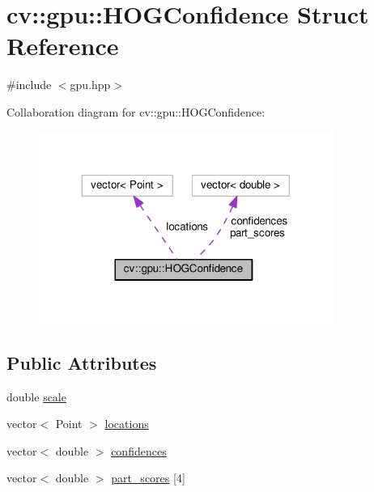 \hypertarget{structcv_1_1gpu_1_1HOGConfidence}{\section{cv\-:\-:gpu\-:\-:H\-O\-G\-Confidence Struct Reference}
\label{structcv_1_1gpu_1_1HOGConfidence}
}


{\ttfamily \#include $<$gpu.\-hpp$>$}



Collaboration diagram for cv\-:\-:gpu\-:\-:H\-O\-G\-Confidence\-:\nopagebreak
\begin{figure}[H]
\begin{center}
\leavevmode
\includegraphics[width=272pt]{structcv_1_1gpu_1_1HOGConfidence__coll__graph}
\end{center}
\end{figure}
\subsection*{Public Attributes}
\begin{DoxyCompactItemize}
\item 
double \hyperlink{structcv_1_1gpu_1_1HOGConfidence_af738aabee1627811b755e2684c469f0d}{scale}
\item 
vector$<$ Point $>$ \hyperlink{structcv_1_1gpu_1_1HOGConfidence_abc89125e427cdf2acd7d15643abbf302}{locations}
\item 
vector$<$ double $>$ \hyperlink{structcv_1_1gpu_1_1HOGConfidence_a826ac3c9eb800b4dd0efe393e29262d6}{confidences}
\item 
vector$<$ double $>$ \hyperlink{structcv_1_1gpu_1_1HOGConfidence_acc690e495cab679ba15a6fa1ab95d142}{part\-\_\-scores} \mbox{[}4\mbox{]}
\end{DoxyCompactItemize}


